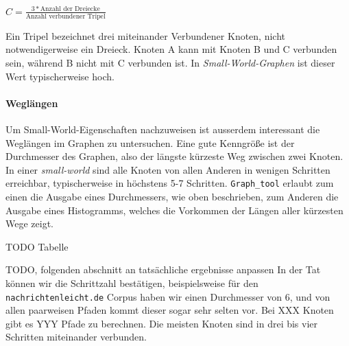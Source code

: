\documentclass[12pt]{article}
\begin{document}
\begin{center}
  \begin{math}
    C = \frac{3*\text{Anzahl der Dreiecke}}{\text{Anzahl verbundener Tripel}}
  \end{math}
\end{center}


Ein Tripel bezeichnet drei miteinander Verbundener Knoten, nicht notwendigerweise ein Dreieck. Knoten A kann mit Knoten B und C verbunden sein, während B nicht mit C verbunden ist. In \emph{Small-World-Graphen} ist dieser Wert typischerweise hoch. 




\paragraph{Wegl\"angen}
Um Small-World-Eigenschaften nachzuweisen ist ausserdem interessant die Weglängen im Graphen zu untersuchen. Eine gute Kenngröße ist der Durchmesser des Graphen, also der längste kürzeste Weg zwischen zwei Knoten. In einer \emph{small-world} sind alle Knoten von allen Anderen in wenigen Schritten erreichbar, typischerweise in höchstens 5-7 Schritten. \texttt{Graph_tool} erlaubt zum einen die Ausgabe eines Durchmessers, wie oben beschrieben, zum Anderen die Ausgabe eines Histogramms, welches die Vorkommen der Längen aller kürzesten Wege zeigt.

TODO Tabelle

TODO, folgenden abschnitt an tatsächliche ergebnisse anpassen
In der Tat können wir die Schrittzahl bestätigen, beispielsweise für den \texttt{nachrichtenleicht.de} Corpus haben wir einen Durchmesser von 6, und von allen paarweisen Pfaden kommt dieser sogar sehr selten vor. Bei XXX Knoten gibt es YYY Pfade zu berechnen. Die meisten Knoten sind in drei bis vier Schritten miteinander verbunden.
\end{document}
